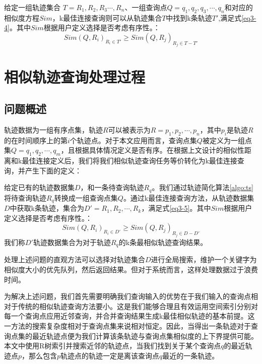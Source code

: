 \theoremstyle{definition}
\begin{definition}
	给定一组轨迹集合 $T = {R_{1}, R_{2}, R_{3} \cdots, R_{n}}$、一组查询点$Q = {q_{1},q_{2},q_{3},\cdots, q_{n}}$和对应的相似度方程$Sim$，k最佳连接查询则可以从轨迹集合$T$中找到k条轨迹$T'$,满足式\ref{eq3-4}。其中$Sim$根据用户定义选择是否考虑有序性。：
	\begin{equation}
		\label{eq3-4}
		Sim(Q,R_{i})_{R_{i} \in T'} \geq Sim(Q,R_{j})_{R_{j} \in T-T'}
	\end{equation}
\end{definition}

\section{相似轨迹查询处理过程}
\label{sec:query processing}

\subsection{问题概述}
\label{sec:problem Forumation}
轨迹数据为一组有序点集，轨迹$R$可以被表示为$R={p_{1}, p_{2}, \cdots, p_{n}}$，其中$p_{i}$是轨迹$R$的在时间顺序上的第$i$个轨迹点。对于本文应用而言，查询点集$Q$被定义为一组点集$Q={q_{1}, q_{2}, \cdots, q_{m}}$，且根据具体情况定义是否有序。在根据上文设计的相似性距离和k最佳连接定义后，我们将我们相似轨迹查询任务等价转化为k最佳连接查询，并产生下面的定义：

\theoremstyle{definition}
\begin{definition}
	给定已有的轨迹数据集$D$，和一条待查询轨迹$R_{q}$。我们通过轨迹简化算法\ref{algo:ts}将待查询轨迹$R_{q}$转换成一组查询点集$Q$。通过k最佳连接查询方法，从轨迹数据集$D$中获取k条轨迹，集合为$D' = {R_{1}, R_{2}, \cdots, R_{k}}$，满足式\ref{eq3-5}。其中$Sim$根据用户定义选择是否考虑有序性。：
	\begin{equation}
		\label{eq3-5}
		Sim(Q,R_{i})_{R_{i} \in D'} \geq Sim(Q,R_{j})_{R_{j} \in D-D'}
	\end{equation}
	我们称$D'$轨迹数据集合为对于轨迹$R_{q}$的k条最相似轨迹查询结果。
\end{definition}

处理上述问题的直观方法可以选择对轨迹集合$D$进行全局搜索，维护一个关键字为相似度大小的优先队列，然后返回结果。但对于系统而言，这样处理数据过于浪费时间。

为解决上述问题，我们首先需要明确我们查询输入的优势在于我们输入的查询点相对于传统的相似轨迹查询方法要小。这是我们能够合理且有效运用空间索引分别对每一个查询点应用近邻查询，并合并查询结果生成k最佳相似轨迹的基本前提。这一方法的搜索复杂度相对于查询点集来说相对恒定。因此，当得出一条轨迹对于查询点集的最近轨迹点便为我们计算该条轨迹与查询点集相似度的上下界提供可能。本文中使用R树索引并搜索近邻的轨迹点，当我们找到关于某个查询点$q$的最近轨迹点$p$，那么包含$p$轨迹点的轨迹一定是离该查询点$q$最近的一条轨迹。

